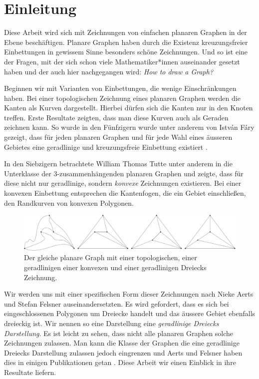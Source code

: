 \chapter{Einleitung}
Diese Arbeit wird sich mit Zeichnungen von einfachen planaren Graphen in der Ebene beschäftigen. Planare Graphen haben durch die Existenz kreuzungsfreier Einbettungen in gewissem Sinne besonders schöne Zeichnungen. Und so ist eine der Fragen, mit der sich schon viele Mathematiker*innen auseinander gesetzt haben und der auch hier nachgegangen wird: \glqq\textit{How to draw a Graph?}\grqq\cite{tutte63}

Beginnen wir mit Varianten von Einbettungen, die wenige Einschränkungen haben. Bei einer topologischen Zeichnung eines planaren Graphen werden die Kanten als Kurven dargestellt. Hierbei dürfen sich die Kanten nur in den Knoten treffen. Erste Resultate zeigten, dass man diese Kurven auch als Geraden zeichnen kann. So wurde in den Fünfzigern wurde unter anderem von István Fáry gezeigt, dass für jeden planaren Graphen und für jede Wahl eines äusseren Gebietes eine geradlinige und kreuzungsfreie Einbettung existiert \cite{fary48}.

In den Siebzigern betrachtete William Thomas Tutte unter anderem in \cite{tutte63} die Unterklasse der 3-zusam\-men\-hängenden planaren Graphen und zeigte, dass für diese nicht nur geradlinige, sondern \textit{konvexe} Zeichnungen existieren. Bei einer konvexen Einbettung entsprechen die Kantenfogen, die ein Gebiet einschließen, den Randkurven von konvexen Polygonen.

\begin{figure}[h]
	\centering
  \includegraphics[width=1\textwidth]{topo_straight_convex.png}
	\caption{Der gleiche planare Graph mit einer topologischen, einer geradlinigen einer konvexen und einer geradlinigen Dreiecks Zeichnung.}
	\label{topo_straight_convex}
\end{figure}

Wir werden uns mit einer spezifischen Form dieser Zeichnungen nach Nieke Aerts und Stefan Felsner auseinandersetzten. Es wird gefordert, dass es sich bei eingeschlossenen Polygonen um Dreiecke handelt und das äussere Gebiet ebenfalls dreieckig ist. Wir nennen so eine Darstellung eine \textit{geradlinige Dreiecks Darstellung}. Es ist leicht zu sehen, dass nicht alle planaren Graphen solche Zeichnungen zulassen. Man kann die Klasse der Graphen die eine geradlinige Dreiecks Darstellung zulassen jedoch eingrenzen und Aerts und Felsner haben dies in einigen Publikationen getan \cite{af13h,af13,af15}. Diese Arbeit wir einen Einblick in ihre Resultate liefern.\\

